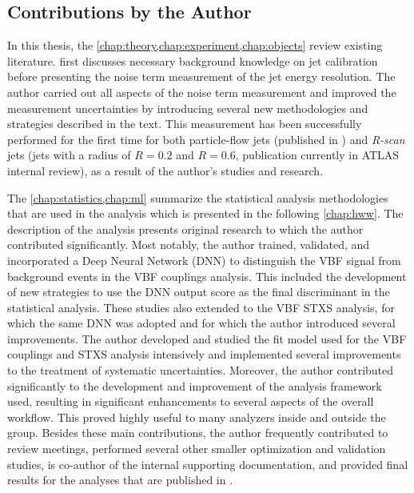 \subsection*{Contributions by the Author}
\label{sec:contributions}
In this thesis, the \cref{chap:theory,chap:experiment,chap:objects} review existing literature.  first discusses necessary background knowledge on jet calibration before presenting the noise term measurement of the jet energy resolution. The author carried out all aspects of the noise term measurement and improved the measurement uncertainties by introducing several new methodologies and strategies described in the text. This measurement has been successfully performed for the first time for both particle-flow jets (published in ) and \emph{R-scan} jets (jets with a radius of $R=0.2$ and $R=0.6$, publication currently in ATLAS internal review), as a result of the author's studies and research.

The \cref{chap:statistics,chap:ml} summarize the statistical analysis methodologies that are used in the \HWW analysis which is presented in the following \cref{chap:hww}. The description of the \HWW analysis presents original research to which the author contributed significantly. Most notably, the author trained, validated, and incorporated a Deep Neural Network (DNN) to distinguish the VBF signal from background events in the VBF couplings analysis. This included the development of new strategies to use the DNN output score as the final discriminant in the statistical analysis. These studies also extended to the VBF STXS analysis, for which the same DNN was adopted and for which the author introduced several improvements.
The author developed and studied the fit model used for the VBF couplings and STXS analysis intensively and implemented several improvements to the treatment of systematic uncertainties.
Moreover, the author contributed significantly to the development and improvement of the analysis framework used, resulting in significant enhancements to several aspects of the overall workflow. This proved highly useful to many analyzers inside and outside the \HWW group.
Besides these main contributions, the author frequently contributed to review meetings, performed several other smaller optimization and validation studies, is co-author of the internal supporting documentation, and provided final results for the analyses that are published in .

